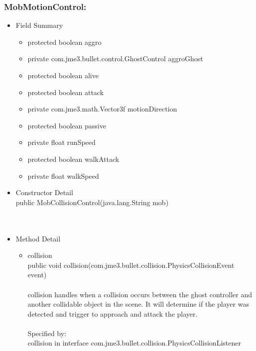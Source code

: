 \documentclass[letterpaper]{article}
\begin{document}
						\subsubsection*{MobMotionControl:}
						\vspace{0.1in}	
							\begin{itemize}
								\item	Field Summary
										\begin{itemize}
											\item	protected boolean	aggro 
											\item	private com.jme3.bullet.control.GhostControl	aggroGhost 
											\item	protected boolean	alive 
											\item	protected boolean	attack 
											\item	private com.jme3.math.Vector3f	motionDirection 
											\item	protected boolean	passive 
											\item	private float	runSpeed 
											\item	protected boolean	walkAttack 
											\item	private float	walkSpeed 
										\end{itemize}
								\item	Constructor Detail \\
										public MobCollisionControl(java.lang.String mob) \\ \\ \\
								\item	Method Detail
										\begin{itemize}
											\item	collision \\
													public void collision(com.jme3.bullet.collision.PhysicsCollisionEvent event) \\ \\
													collision handles when a collision occurs between the ghost controller and another collidable object in the scene. It will determine if the player was detected and trigger to approach and attack the player. \\ \\
													Specified by: \\
													collision in interface com.jme3.bullet.collision.PhysicsCollisionListener \\ \\

\end{itemize}
\end{itemize}
\end{document}
